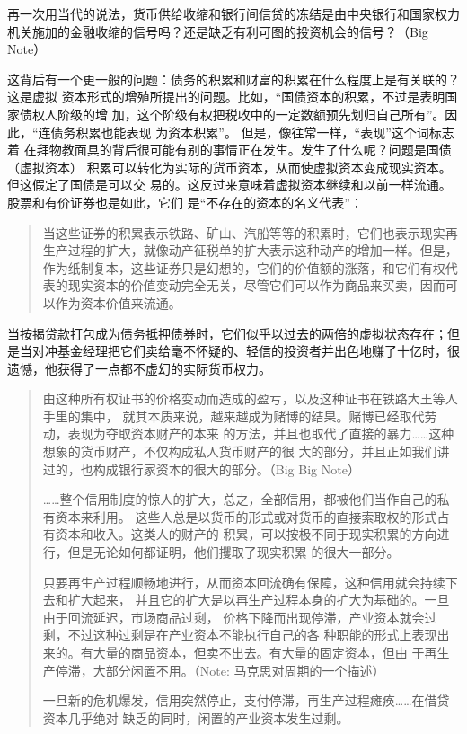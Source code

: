 再一次用当代的说法，货币供给收缩和银行间信贷的冻结是由中央银行和国家权力机关施加的金融收缩的信号吗？还是缺乏有利可图的投资机会的信号？（Big Note）

这背后有一个更一般的问题：债务的积累和财富的积累在什么程度上是有关联的？这是虚拟
资本形式的增殖所提出的问题。比如，“国债资本的积累，不过是表明国家债权人阶级的增
加，这个阶级有权把税收中的一定数额预先划归自己所有”。因此，“连债务积累也能表现
为资本积累”。 但是，像往常一样，“表现”这个词标志着
在拜物教面具的背后很可能有别的事情正在发生。发生了什么呢？问题是国债（虚拟资本）
积累可以转化为实际的货币资本，从而使虚拟资本变成现实资本。但这假定了国债是可以交
易的。这反过来意味着虚拟资本继续和以前一样流通。股票和有价证券也是如此，它们
是“不存在的资本的名义代表”：

\begin{quotation}
当这些证券的积累表示铁路、矿山、汽船等等的积累时，它们也表示现实再生产过程的扩大，就像动产征税单的扩大表示这种动产的增加一样。但是，作为纸制复本，这些证券只是幻想的，它们的价值额的涨落，和它们有权代表的现实资本的价值变动完全无关，尽管它们可以作为商品来买卖，因而可以作为资本价值来流通。 

\end{quotation}

当按揭贷款打包成为债务抵押债券时，它们似乎以过去的两倍的虚拟状态存在；但是当对冲基金经理把它们卖给毫不怀疑的、轻信的投资者并出色地赚了十亿时，很遗憾，他获得了一点都不虚幻的实际货币权力。


\begin{quotation}
  由这种所有权证书的价格变动而造成的盈亏，以及这种证书在铁路大王等人手里的集中，
  就其本质来说，越来越成为赌博的结果。赌博已经取代劳动，表现为夺取资本财产的本来
  的方法，并且也取代了直接的暴力……这种想象的货币财产，不仅构成私人货币财产的很
  大的部分，并且正如我们讲过的，也构成银行家资本的很大的部分。（Big Big Note）

  ……整个信用制度的惊人的扩大，总之，全部信用，都被他们当作自己的私有资本来利用。
  这些人总是以货币的形式或对货币的直接索取权的形式占有资本和收入。这类人的财产的
  积累，可以按极不同于现实积累的方向进行，但是无论如何都证明，他们攫取了现实积累
  的很大一部分。

  只要再生产过程顺畅地进行，从而资本回流确有保障，这种信用就会持续下去和扩大起来，
  并且它的扩大是以再生产过程本身的扩大为基础的。一旦由于回流延迟，市场商品过剩，
  价格下降而出现停滞，产业资本就会过剩，不过这种过剩是在产业资本不能执行自己的各
  种职能的形式上表现出来的。有大量的商品资本，但卖不出去。有大量的固定资本，但由
  于再生产停滞，大部分闲置不用。（Note: 马克思对周期的一个描述） 

  一旦新的危机爆发，信用突然停止，支付停滞，再生产过程瘫痪……在借贷资本几乎绝对
  缺乏的同时，闲置的产业资本发生过剩。
\end{quotation}

